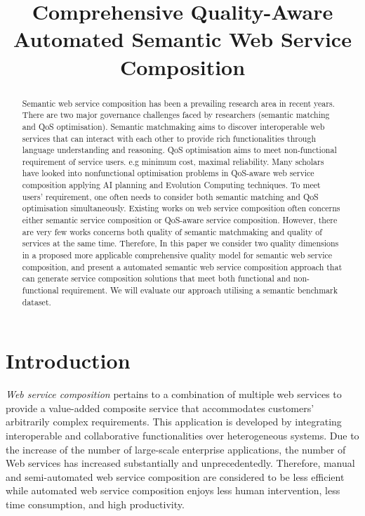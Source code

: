 \documentclass{llncs}
\title{Comprehensive Quality-Aware Automated Semantic Web Service Composition}
\begin{document}
\maketitle
\vspace{-0.8cm}

\begin{abstract}
Semantic web service composition has been a prevailing research area in recent years. There are two major governance challenges faced by researchers (semantic matching and QoS optimisation). Semantic matchmaking aims to discover interoperable web services that can interact with each other to provide rich functionalities through language understanding and reasoning. QoS optimisation aims to meet non-functional requirement of service users. e.g minimum cost, maximal reliability. Many scholars have looked into nonfunctional optimisation problems in QoS-aware web service composition applying AI planning and Evolution Computing techniques. To meet users' requirement, one often needs to consider both semantic matching and QoS optimisation simultaneously. Existing works on web service composition often concerns either semantic service composition or QoS-aware service composition. However, there are very few works concerns both quality of semantic matchmaking and quality of services at the same time. Therefore, In this paper we consider two quality dimensions in a proposed more applicable comprehensive quality model for semantic web service composition, and present a automated semantic web service composition approach that can generate service composition solutions that meet both functional and non-functional requirement. We will evaluate our approach utilising a semantic benchmark dataset.

\end{abstract}
\vspace{-0.8cm}
\section{Introduction}\label{introduction}

\textit{Web service composition} pertains to a combination of multiple web services to provide a value-added composite service that accommodates customers' arbitrarily complex requirements. This application is developed by integrating interoperable and collaborative functionalities over heterogeneous systems. Due to the increase of the number of large-scale enterprise applications, the number of Web services has increased substantially and unprecedentedly. Therefore, manual and semi-automated web service composition are considered to be less efficient while automated web service composition enjoys less human intervention, less time consumption, and high productivity.
\end{document}
